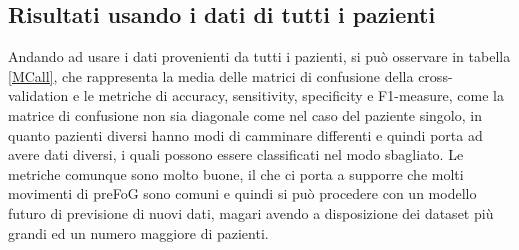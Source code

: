 \subsection{Risultati usando i dati di tutti i pazienti}
Andando ad usare i dati provenienti da tutti i pazienti, si può osservare in tabella \ref{MCall}, che rappresenta la media delle matrici di confusione della cross-validation e le metriche di accuracy, sensitivity, specificity e F1-measure, come la matrice di confusione non sia diagonale come nel caso del paziente singolo, in quanto pazienti diversi hanno modi di camminare differenti e quindi porta ad avere dati diversi, i quali possono essere classificati nel modo sbagliato. Le metriche comunque sono molto buone, il che ci porta a supporre che molti movimenti di preFoG sono comuni e quindi si può procedere con un modello futuro di previsione di nuovi dati, magari avendo a disposizione dei dataset più grandi ed un numero maggiore di pazienti.
\begin{table}[]
	\centering
	\caption{Matrice confusione e metriche di misura della cross-validation con i dati di tutti i pazienti}
	\label{MCall}
\end{table}